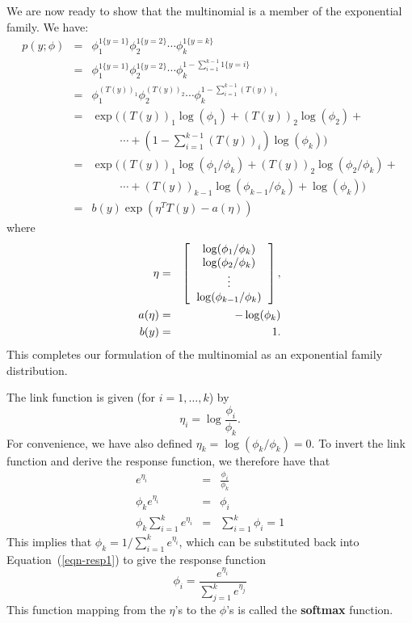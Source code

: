 \documentclass{article}
\begin{document}
We are now ready to show that the multinomial is a member of the
exponential family. We have:
\begin{eqnarray*}
p(y;\phi)
&=& \phi_1^{1\{y=1\}} \phi_2^{1\{y=2\}} \cdots \phi_k^{1\{y=k\}} \\
&=& \phi_1^{1\{y=1\}} \phi_2^{1\{y=2\}} \cdots \phi_k^{1-\sum_{i=1}^{k-1} 1\{y=i\}} \\
&=& \phi_1^{(T(y))_1} \phi_2^{(T(y))_2} \cdots \phi_k^{1-\sum_{i=1}^{k-1} (T(y))_i} \\
&=& \exp((T(y))_1 \log(\phi_1) +  (T(y))_2 \log(\phi_2) +
    \\
    && \;\;\;\;\;\;\;\;\;
    \cdots +
    \left( {1-{\textstyle \sum_{i=1}^{k-1} (T(y))_i}}\right) \log(\phi_k))\\
&=& \exp((T(y))_1 \log(\phi_1/\phi_k) +  (T(y))_2 \log(\phi_2/\phi_k) +
    \\
    && \;\;\;\;\;\;\;\;\;
    \cdots + (T(y))_{k-1} \log(\phi_{k-1}/\phi_k) + \log(\phi_k))\\
&=& b(y) \exp(\eta^T T(y) - a(\eta))
\end{eqnarray*}
where
\begin{eqnarray*}
\eta &=& \left[ \begin{tabular}{c} $\log (\phi_1/\phi_k)$ \\
$\log (\phi_2/\phi_k)$ \\
$\vdots$ \\
$\log (\phi_{k-1}/\phi_k)$ \end{tabular}  \right], \\
a(\eta) &=& -\log(\phi_k) \\
b(y)&=&1.
\end{eqnarray*}
This completes our formulation of the multinomial as an exponential family
distribution.

The link function is given (for $i=1,\ldots,k$) by
\[
\eta_i = \log \frac{\phi_i}{\phi_k}.
\]
For convenience, we have also defined $\eta_k = \log(\phi_k/\phi_k) = 0$.
To invert the link function and derive the response function, we therefore have
that
\begin{eqnarray}
e^{\eta_i} &=& \frac{\phi_i}{\phi_k}   \nonumber  \\
\phi_k e^{\eta_i} &=& \phi_i    \label{eqn-resp1} \\
\phi_k \sum_{i=1}^k e^{\eta_i} &=& \sum_{i=1}^k \phi_i = 1   \nonumber
\end{eqnarray}
This implies that $\phi_k = 1/\sum_{i=1}^k e^{\eta_i}$, which can be substituted back
into Equation~(\ref{eqn-resp1}) to give the response function
\[
\phi_i = \frac{e^{\eta_i}}{\sum_{j=1}^k e^{\eta_j}}
\]
This function mapping from the $\eta$'s to the $\phi$'s is called the
{\bf softmax} function.
\end{document}
